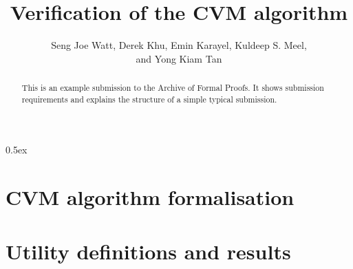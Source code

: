 \documentclass[11pt, a4paper]{report}
\begin{document}
\title{Verification of the CVM algorithm}

\author{
  Seng Joe Watt,
  Derek Khu,
  Emin Karayel,
  Kuldeep S. Meel,
  \\
  and Yong Kiam Tan}

\maketitle

\begin{abstract}
  This is an example submission to the Archive of Formal Proofs. It
  shows submission requirements and explains the structure of a simple
  typical submission.
\end{abstract}

\tableofcontents

\parindent 0pt
\parskip 0.5ex

\chapter{CVM algorithm formalisation}










\chapter{Utility definitions and results}














\end{document}
